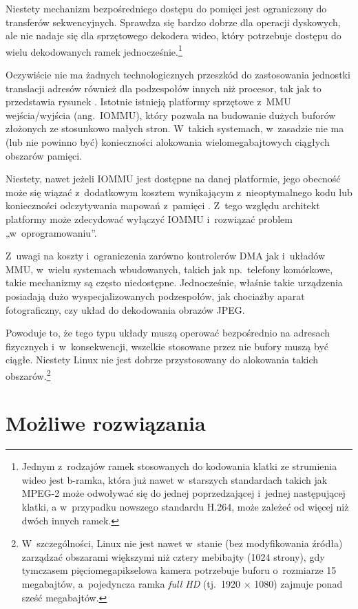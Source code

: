 Niestety mechanizm bezpośredniego dostępu do pomięci jest ograniczony
do transferów sekwencyjnych.  Sprawdza się bardzo dobrze dla operacji
dyskowych, ale nie nadaje się dla sprzętowego dekodera wideo, który
potrzebuje dostępu do wielu dekodowanych ramek
jednocześnie.\footnote{Jednym z~rodzajów ramek stosowanych do
  kodowania klatki ze strumienia wideo jest b-ramka, która już nawet
  w~starszych standardach takich jak MPEG-2 może odwoływać się do
  jednej poprzedzającej i~jednej następującej klatki, a w~przypadku
  nowszego standardu H.264, może zależeć od więcej niż dwóch innych
  ramek.}

Oczywiście nie ma żadnych technologicznych przeszkód do zastosowania
jednostki translacji adresów również dla podzespołów innych niż
procesor, tak jak to przedstawia rysunek .
Istotnie istnieją platformy sprzętowe z~MMU wejścia/wyjścia
(ang.\ IOMMU), który pozwala na budowanie dużych buforów złożonych ze
stosunkowo małych stron.  W~takich systemach, w~zasadzie nie ma (lub
nie powinno być) konieczności alokowania wielomegabajtowych ciągłych
obszarów pamięci.

Niestety, nawet jeżeli IOMMU jest dostępne na danej platformie, jego
obecność może się wiązać z~dodatkowym kosztem wynikającym
z~nieoptymalnego kodu \autocite{bib:price-of-safety} lub konieczności
odczytywania mapowań z~pamięci
\autocite{bib:mitigate-iotlb-bottleneck}.  Z~tego względu architekt
platformy może zdecydować wyłączyć IOMMU i~rozwiązać problem
„w~oprogramowaniu”.

Z~uwagi na koszty i~ograniczenia zarówno kontrolerów DMA jak i~układów
MMU, w~wielu systemach wbudowanych, takich jak np.\ telefony
komórkowe, takie mechanizmy są często niedostępne.  Jednocześnie,
właśnie takie urządzenia posiadają dużo wyspecjalizowanych
podzespołów, jak chociażby aparat fotograficzny, czy układ do
dekodowania obrazów JPEG.

Powoduje to, że tego typu układy muszą operować bezpośrednio na
adresach fizycznych i~w~konsekwencji, wszelkie stosowane przez nie
bufory muszą być ciągłe.  Niestety Linux nie jest dobrze przystosowany
do alokowania takich obszarów.\footnote{W~szczególności, Linux nie
  jest nawet w~stanie (bez modyfikowania źródła) zarządzać obszarami
  większymi niż cztery mebibajty (1024 strony), gdy tymczasem
  pięciomegapikselowa kamera potrzebuje buforu o~rozmiarze 15
  megabajtów, a~pojedyncza ramka {\it full HD} (tj.\ 1920 $\times$
  1080) zajmuje ponad sześć megabajtów.}


\section{Możliwe rozwiązania}

